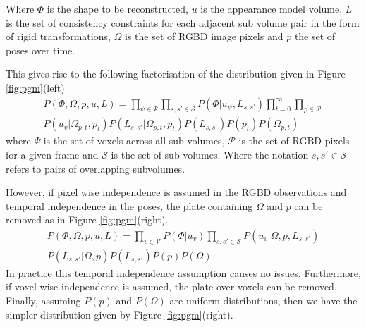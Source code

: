 Where $\Phi$ is the shape to be reconstructed, $u$ is the appearance model volume, $L$ is the 
set of consistency constraints for each adjacent sub volume pair in the form of rigid transformations, $\Omega$ is the set of 
RGBD image pixels and $p$ the set of poses over time.

This gives rise to the following factorisation of the distribution given in Figure \ref{fig:pgm}(left)
\begin{equation}
\begin{split}
P(\Phi, \Omega, p, u, L) = 
\prod_{\psi \in \Psi}\prod_{s, s' \in \mathcal{S}}P(\Phi|u_{\psi}, L_{s, s'}) 
\prod_{t=0}^{\infty}\prod_{p \in \mathcal{P}}\\
P(u_{v}|\Omega_{p, t}, p_{t})
P(L_{s, s'}|\Omega_{p, t}, p_{t})
P(L_{s, s'})P(p_{t})P(\Omega_{p, t})
\end{split}
\end{equation}
where $\Psi$ is the set of voxels across all sub volumes, $\mathcal{P}$ is the set of RGBD pixels for a given 
frame and $\mathcal{S}$ is the set of sub volumes. Where the notation $s, s' \in \mathcal{S}$ refers to pairs of overlapping subvolumes.

However, if pixel wise independence is assumed in the RGBD observations and temporal independence in 
the poses, the plate containing $\Omega$ and $p$ can be removed as in Figure \ref{fig:pgm}(right).
\begin{equation}
\begin{split}
P(\Phi, \Omega, p, u, L) = 
\prod_{v \in \mathcal{V}}P(\Phi|u_{v})
\prod_{s, s' \in \mathcal{S}}P(u_{v}|\Omega, p, L_{s, s'}) \\
P(L_{s, s'}|\Omega, p) P(L_{s, s'})P(p)P(\Omega)
\end{split}
\end{equation}
In practice this temporal independence assumption causes no issues. Furthermore, if voxel wise independence is assumed, the plate over voxels can be removed. Finally, assuming $P(p)$ and 
$P(\Omega)$ are uniform distributions, then we have the simpler distribution given by Figure \ref{fig:pgm}(right).

